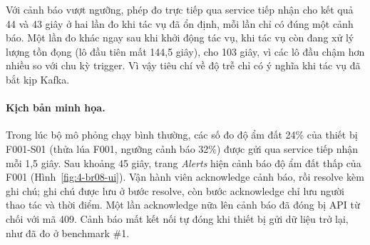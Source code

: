 Với cảnh báo vượt ngưỡng, phép đo trực tiếp qua service tiếp nhận cho kết quả 44 và 43 giây ở hai lần đo khi tác vụ đã ổn định, mỗi lần chỉ có đúng một cảnh báo. Một lần đo khác ngay sau khi khởi động tác vụ, khi tác vụ còn đang xử lý lượng tồn đọng (lô đầu tiên mất 144,5 giây), cho 103 giây, vì các lô đầu chậm hơn nhiều so với chu kỳ trigger. Vì vậy tiêu chí về độ trễ chỉ có ý nghĩa khi tác vụ đã bắt kịp Kafka.

\paragraph{Kịch bản minh họa.} Trong lúc bộ mô phỏng chạy bình thường, các số đo độ ẩm đất 24\% của thiết bị F001-S01 (thửa lúa F001, ngưỡng cảnh báo 32\%) được gửi qua service tiếp nhận mỗi 1,5 giây. Sau khoảng 45 giây, trang \emph{Alerts} hiện cảnh báo độ ẩm đất thấp của F001 (Hình~\ref{fig:4-br08-ui}). Vận hành viên acknowledge cảnh báo, rồi resolve kèm ghi chú; ghi chú được lưu ở bước resolve, còn bước acknowledge chỉ lưu người thao tác và thời điểm. Một lần acknowledge nữa lên cảnh báo đã đóng bị API từ chối với mã 409. Cảnh báo mất kết nối tự đóng khi thiết bị gửi dữ liệu trở lại, như đã đo ở benchmark \#1.
